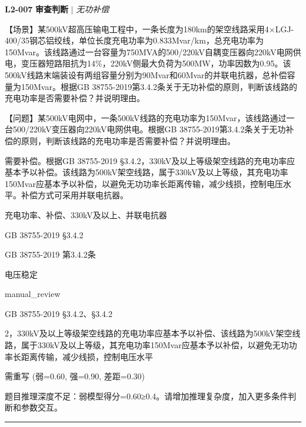 \documentclass[11pt,a4paper]{ctexart}
\begin{document}
\noindent\textbf{L2-007} \hfill \textbf{审查判断} $|$ \textit{无功补偿}
\begin{description}[leftmargin=1.5em,style=nextline,font=\normalfont]
  \item[Q:] 【场景】某500kV超高压输电工程中，一条长度为180km的架空线路采用4×LGJ-400/35钢芯铝绞线，单位长度充电功率为0.833Mvar/km，总充电功率为150Mvar。该线路通过一台容量为750MVA的500/220kV自耦变压器向220kV电网供电，变压器短路阻抗为14\%，220kV侧最大负荷为500MW，功率因数为0.95。该500kV线路末端装设有两组容量分别为90Mvar和60Mvar的并联电抗器，总补偿容量为150Mvar。根据GB 38755-2019第3.4.2条关于无功补偿的原则，判断该线路的充电功率是否需要补偿？并说明理由。

【问题】某500kV电网中，一条500kV线路的充电功率为150Mvar，该线路通过一台500/220kV变压器向220kV电网供电。根据GB 38755-2019第3.4.2条关于无功补偿的原则，判断该线路的充电功率是否需要补偿？并说明理由。
  \item[A:] 需要补偿。根据GB 38755-2019 §3.4.2，330kV及以上等级架空线路的充电功率应基本予以补偿。该线路为500kV架空线路，属于330kV及以上等级，其充电功率150Mvar应基本予以补偿，以避免无功功率长距离传输，减少线损，控制电压水平。补偿方式可采用并联电抗器。
  \item[KW:] 充电功率、补偿、330kV及以上、并联电抗器
  \item[标准:] GB 38755-2019 §3.4.2
  \item[条款溯源:] GB 38755-2019 第3.4.2条
  \item[主题:] 电压稳定
  \item[评分方式:] manual\_review
  \item[Rubric条款:] GB 38755-2019 §3.4.2、§3.4.2
  \item[Rubric判据:] 2，330kV及以上等级架空线路的充电功率应基本予以补偿、该线路为500kV架空线路，属于330kV及以上等级，其充电功率150Mvar应基本予以补偿，以避免无功功率长距离传输，减少线损，控制电压水平
  \item[LJ判定:] 需重写 (弱=0.60, 强=0.90, 差距=0.30)
  \item[LJ反馈:] 题目推理深度不足：弱模型得分=0.60≥0.4。请增加推理复杂度，加入更多条件判断和参数交互。
\end{description}
\vspace{4pt}
\hrule
\vspace{6pt}
\end{document}
